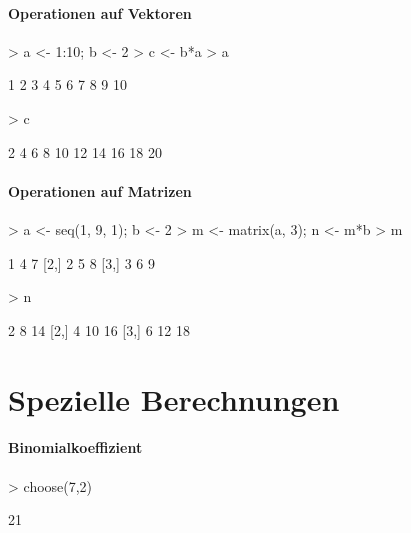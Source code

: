 \paragraph{Operationen auf Vektoren}
\begin{Schunk}
\begin{Sinput}
> a <- 1:10; b <- 2
> c <- b*a
> a
\end{Sinput}
\begin{Soutput}
 [1]  1  2  3  4  5  6  7  8  9 10
\end{Soutput}
\begin{Sinput}
> c
\end{Sinput}
\begin{Soutput}
 [1]  2  4  6  8 10 12 14 16 18 20
\end{Soutput}
\end{Schunk}

\paragraph{Operationen auf Matrizen}
\begin{Schunk}
\begin{Sinput}
> a <- seq(1, 9, 1); b <- 2
> m <- matrix(a, 3); n <- m*b
> m
\end{Sinput}
\begin{Soutput}
     [,1] [,2] [,3]
[1,]    1    4    7
[2,]    2    5    8
[3,]    3    6    9
\end{Soutput}
\begin{Sinput}
> n
\end{Sinput}
\begin{Soutput}
     [,1] [,2] [,3]
[1,]    2    8   14
[2,]    4   10   16
[3,]    6   12   18
\end{Soutput}
\end{Schunk}

\section{Spezielle Berechnungen}

\paragraph{Binomialkoeffizient}
\begin{Schunk}
\begin{Sinput}
> choose(7,2)
\end{Sinput}
\begin{Soutput}
[1] 21
\end{Soutput}
\end{Schunk}

